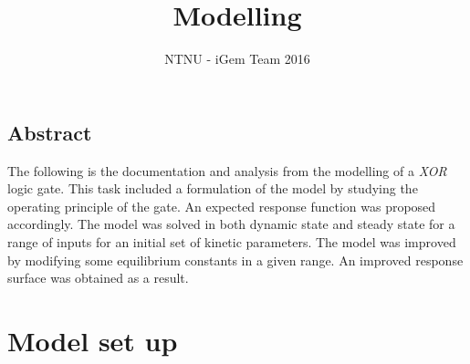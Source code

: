 \documentclass[10pt]{article}
\title{Modelling}
\author{NTNU - iGem Team 2016}
\begin{document}
\maketitle

\begin{center}
\section*{Abstract}
The following is the documentation and analysis from the modelling of a \textit{XOR} logic gate. This task included a formulation of the model by studying the operating principle of the gate. An expected response function was proposed accordingly. The model was solved in both dynamic state and steady state for a range of inputs for an initial set of kinetic parameters. The model was improved by modifying some equilibrium constants in a given range. An improved response surface was obtained as a result. 
\end{center}

\section{Model set up}
\end{document}
